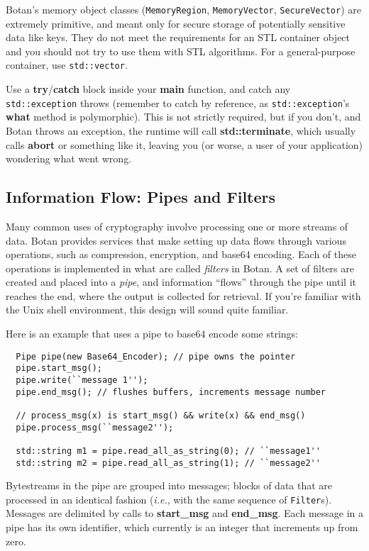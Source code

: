 \documentclass{article}
\newcommand{\function}[1]{\textbf{#1}}
\newcommand{\type}[1]{\texttt{#1}}
\newcommand{\ie}[0]{\emph{i.e.}}
\begin{document}
Botan's memory object classes (\type{MemoryRegion},
\type{MemoryVector}, \type{SecureVector}) are extremely primitive, and
meant only for secure storage of potentially sensitive data like
keys. They do not meet the requirements for an STL container object
and you should not try to use them with STL algorithms. For a
general-purpose container, use \type{std::vector}.

Use a \function{try}/\function{catch} block inside your
\function{main} function, and catch any \type{std::exception} throws
(remember to catch by reference, as \type{std::exception}'s
\function{what} method is polymorphic). This is not strictly required,
but if you don't, and Botan throws an exception, the runtime will call
\function{std::terminate}, which usually calls \function{abort} or
something like it, leaving you (or worse, a user of your application)
wondering what went wrong.

\subsection{Information Flow: Pipes and Filters}

Many common uses of cryptography involve processing one or more
streams of data. Botan provides services that make setting up data
flows through various operations, such as compression, encryption, and
base64 encoding. Each of these operations is implemented in what are
called \emph{filters} in Botan. A set of filters are created and
placed into a \emph{pipe}, and information ``flows'' through the pipe
until it reaches the end, where the output is collected for
retrieval. If you're familiar with the Unix shell environment, this
design will sound quite familiar.

Here is an example that uses a pipe to base64 encode some strings:

\begin{verbatim}
  Pipe pipe(new Base64_Encoder); // pipe owns the pointer
  pipe.start_msg();
  pipe.write(``message 1'');
  pipe.end_msg(); // flushes buffers, increments message number

  // process_msg(x) is start_msg() && write(x) && end_msg()
  pipe.process_msg(``message2'');

  std::string m1 = pipe.read_all_as_string(0); // ``message1''
  std::string m2 = pipe.read_all_as_string(1); // ``message2''
\end{verbatim}

Bytestreams in the pipe are grouped into messages; blocks of data that
are processed in an identical fashion (\ie, with the same sequence of
\type{Filter}s). Messages are delimited by calls to
\function{start\_msg} and \function{end\_msg}. Each message in a pipe
has its own identifier, which currently is an integer that increments
up from zero.
\end{document}

